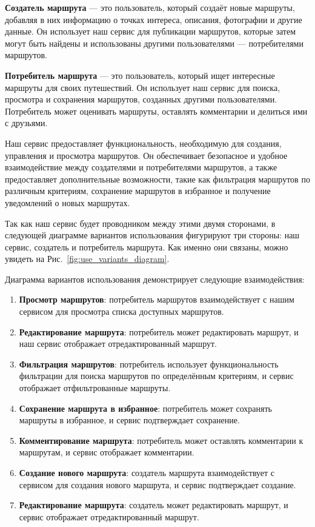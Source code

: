 \textbf{Создатель маршрута} — это пользователь, который создаёт новые маршруты, добавляя в них информацию о точках интереса, описания, фотографии и другие данные. Он использует наш сервис для публикации маршрутов, которые затем могут быть найдены и использованы другими пользователями — потребителями маршрутов.

\textbf{Потребитель маршрута} — это пользователь, который ищет интересные маршруты для своих путешествий. Он использует наш сервис для поиска, просмотра и сохранения маршрутов, созданных другими пользователями. Потребитель может оценивать маршруты, оставлять комментарии и делиться ими с друзьями.

Наш сервис предоставляет функциональность, необходимую для создания, управления и просмотра маршрутов. Он обеспечивает безопасное и удобное взаимодействие между создателями и потребителями маршрутов, а также предоставляет дополнительные возможности, такие как фильтрация маршрутов по различным критериям, сохранение маршрутов в избранное и получение уведомлений о новых маршрутах.

Так как наш сервис будет проводником между этими двумя сторонами, в следующей диаграмме вариантов использования фигурируют три стороны: наш сервис, создатель и потребитель маршрута. Как именно они связаны, можно увидеть на Рис.~\ref{fig:use_variants_diagram}.

Диаграмма вариантов использования демонстрирует следующие взаимодействия:

\begin{enumerate}
    \item \textbf{Просмотр маршрутов}: потребитель маршрутов взаимодействует с нашим сервисом для просмотра списка доступных маршрутов.
    \item \textbf{Редактирование маршрута}: потребитель может редактировать маршрут, и наш сервис отображает отредактированный маршрут.
    \item \textbf{Фильтрация маршрутов}: потребитель использует функциональность фильтрации для поиска маршрутов по определённым критериям, и сервис отображает отфильтрованные маршруты.
    \item \textbf{Сохранение маршрута в избранное}: потребитель может сохранять маршруты в избранное, и сервис подтверждает сохранение.
    \item \textbf{Комментирование маршрута}: потребитель может оставлять комментарии к маршрутам, и сервис отображает комментарии.
    \item \textbf{Создание нового маршрута}: создатель маршрута взаимодействует с сервисом для создания нового маршрута, и сервис подтверждает создание.
    \item \textbf{Редактирование маршрута}: создатель может редактировать маршрут, и сервис отображает отредактированный маршрут.
\end{enumerate}

